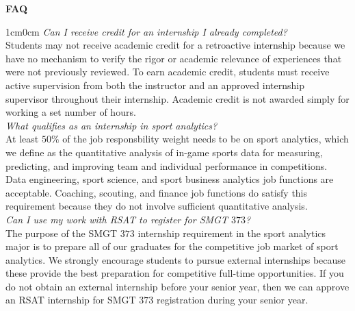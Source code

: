\documentclass[11pt]{article}
\begin{document}
\newpage
\textbf{\textsc{FAQ}}
\begin{adjustwidth}{1cm}{0cm}
  \textit{Can I receive credit for an internship I already completed?}\\
  Students may not receive academic credit for a retroactive internship because we have no mechanism to verify the rigor or academic relevance of experiences that were not previously reviewed. To earn academic credit, students must receive active supervision from both the instructor and an approved internship supervisor throughout their internship. Academic credit is not awarded simply for working a set number of hours.\\

  \textit{What qualifies as an internship in sport analytics?}\\
  At least $50\%$ of the job responsbility weight needs to be on sport analytics, which we define as the quantitative analysis of in-game sports data for measuring, predicting, and improving team and individual performance in competitions. Data engineering, sport science, and sport business analytics job functions are acceptable. Coaching, scouting, and finance job functions do satisfy this requirement because they do not involve sufficient quantitative analysis.\\

  \textit{Can I use my work with RSAT to register for SMGT $373$?}\\
  The purpose of the SMGT $373$ internship requirement in the sport analytics major is to prepare all of our graduates for the competitive job market of sport analytics. We strongly encourage students to pursue external internships because these provide the best preparation for competitive full-time opportunities. If you do not obtain an external internship before your senior year, then we can approve an RSAT internship for SMGT $373$ registration during your senior year.\\
\end{adjustwidth}


\newpage

\end{document}
